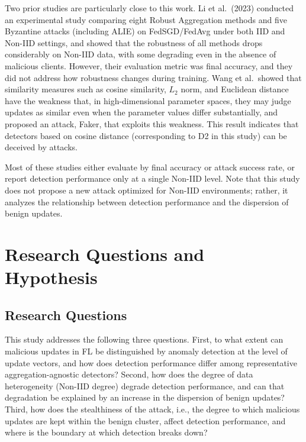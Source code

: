 \documentclass[a4paper,10pt]{article}
\begin{document}
Two prior studies are particularly close to this work. Li et al.\ (2023) conducted an experimental study comparing eight Robust Aggregation methods and five Byzantine attacks (including ALIE) on FedSGD/FedAvg under both IID and Non-IID settings, and showed that the robustness of all methods drops considerably on Non-IID data, with some degrading even in the absence of malicious clients\cite{li2023experimental}. However, their evaluation metric was final accuracy, and they did not address how robustness changes during training. Wang et al.\ showed that similarity measures such as cosine similarity, $L_2$ norm, and Euclidean distance have the weakness that, in high-dimensional parameter spaces, they may judge updates as similar even when the parameter values differ substantially, and proposed an attack, Faker, that exploits this weakness\cite{wang2023trust}. This result indicates that detectors based on cosine distance (corresponding to D2 in this study) can be deceived by attacks.

Most of these studies either evaluate by final accuracy or attack success rate, or report detection performance only at a single Non-IID level. Note that this study does not propose a new attack optimized for Non-IID environments; rather, it analyzes the relationship between detection performance and the dispersion of benign updates.

\section{Research Questions and Hypothesis}
\label{sec:rq}

\subsection{Research Questions}

This study addresses the following three questions. First, to what extent can malicious updates in FL be distinguished by anomaly detection at the level of update vectors, and how does detection performance differ among representative aggregation-agnostic detectors? Second, how does the degree of data heterogeneity (Non-IID degree) degrade detection performance, and can that degradation be explained by an increase in the dispersion of benign updates? Third, how does the stealthiness of the attack, i.e., the degree to which malicious updates are kept within the benign cluster, affect detection performance, and where is the boundary at which detection breaks down?
\end{document}
